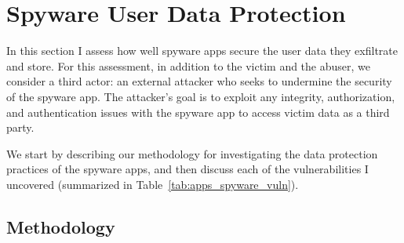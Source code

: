 \section{Spyware User Data Protection}
\label{sec:data-leak}



In this section I assess how well spyware apps secure the user data they exfiltrate and store.
For this assessment, in addition to the victim and the abuser, we
consider a third actor: an external attacker who seeks to undermine the
security of the spyware app.  The attacker's goal is to exploit any
integrity, authorization, and authentication issues with the spyware
app to access victim data as a third party.



We start by describing our
methodology for investigating the data protection practices of the
spyware apps, and then discuss each of the vulnerabilities I uncovered (summarized in Table~\ref{tab:apps_spyware_vuln}).

\subsection{Methodology}
\label{subsec:experiemental_setup}

